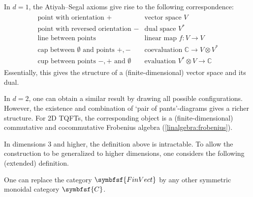     \begin{example}[1D]
        In $d=1$, the Atiyah--Segal axioms give rise to the following correspondence:
        \begin{gather*}
            \begin{array}{l|l}
                \text{point with orientation } + & \text{vector space } V\\
                \text{point with reversed orientation } - & \text{dual space }V^*\\
                \text{line between points} & \text{linear map }f:V\rightarrow V\\
                \text{cap between $\emptyset$ and points } +,- & \text{coevaluation } \mathbb{C}\rightarrow V\otimes V^*\\
                \text{cup between points $-,+$ and }\emptyset & \text{evaluation }V^*\otimes V\rightarrow\mathbb{C}
            \end{array}
        \end{gather*}
        Essentially, this gives the structure of a (finite-dimensional) vector space and its dual.
    \end{example}

    \begin{example}[2D]
        In $d=2$, one can obtain a similar result by drawing all possible configurations. However, the existence and combination of `pair of pants'-diagrams gives a richer structure. For 2D TQFTs, the corresponding object is a (finite-dimensional) commutative and cocommutative Frobenius algebra (\cref{linalgebra:frobenius}).
    \end{example}

    In dimensions 3 and higher, the definition above is intractable. To allow the construction to be generalized to higher dimensions, one considers the following (extended) definition.
    \begin{remark}
        One can replace the category $\symbfsf{FinVect}$ by any other symmetric monoidal category $\symbfsf{C}$.
    \end{remark}

